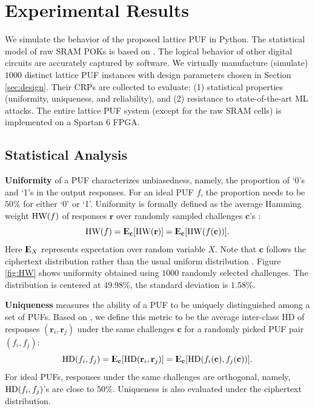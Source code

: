 \section{Experimental Results}
\label{sec:result}

We simulate the behavior of the proposed lattice PUF in Python. The statistical model of raw SRAM POKs is based on \cite{maes2013accurate, maes2009soft}. The logical behavior of other digital circuits are accurately captured by software. We virtually manufacture (simulate) $1000$ distinct lattice PUF instances with design parameters chosen in Section \ref{sec:design}. Their CRPs are collected to evaluate: (1) statistical properties (uniformity, uniqueness, and reliability), and (2) resistance to state-of-the-art ML attacks. The entire lattice PUF system (except for the raw SRAM cells) is implemented on a Spartan 6 FPGA.


\subsection{Statistical Analysis}
\label{sec:statistical_result}
\textbf{Uniformity} of a PUF characterizes unbiasedness, namely, the proportion of `0's and `1's in the output responses.
For an ideal PUF $f$, the proportion needs to be $50\%$ for either `0' or `1'.
Uniformity is formally defined as the average Hamming weight $\HW(f)$ of responses $\mathbf{r}$ over randomly sampled challenges $\mathbf{c}$'s \cite{maiti2013systematic}:
\begin{equation*}
\HW(f)= \Expect_\mathbf{c}[\HW(\mathbf{r})] = \Expect_{\mathbf{c}}[\HW(f(\mathbf{c}))].
\end{equation*}
Here ${\rm I\kern-.3em E}_X$ represents expectation over random variable $X$.
Note that $\mathbf{c}$ follows the ciphertext distribution rather than the usual uniform distribution \cite{maiti2013systematic}.
Figure \ref{fig:HW} shows uniformity obtained using $1000$ randomly selected challenges. 
The distribution is centered at $49.98\%$, the standard deviation is $1.58\%$. 


\textbf{Uniqueness} measures the ability of a PUF to be uniquely distinguished among a set of PUFs. 
Based on \cite{maiti2013systematic}, we define this metric to be the average inter-class HD of responses $(\mathbf{r}_i,\mathbf{r}_j)$ under the same challenges $\mathbf{c}$ for a randomly picked PUF pair $(f_i, f_j)$:
\begin{equation*}
\HD(f_i,f_j) = \Expect_\mathbf{c}[\HD(\mathbf{r}_i,\mathbf{r}_j)]=\Expect_{\mathbf{c}}[\HD(f_i(\mathbf{c}),f_j(\mathbf{c}))].
\end{equation*}
For ideal PUFs, responses under the same challenges are orthogonal, namely, $\HD(f_i,f_j)$'s are close to $50\%$.
Uniqueness is also evaluated under the ciphertext distribution.  

